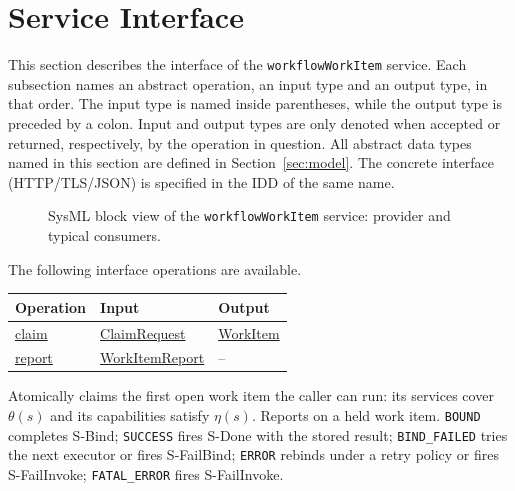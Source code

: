 \documentclass[a4paper]{arrowhead}
\newcommand{\mref}[1]{{\textcolor{ArrowheadPurple}{\hyperref[sec:model:#1]{#1}}}}
\newcommand{\oref}[1]{{\textcolor{ArrowheadBlue}{\hyperref[sec:operations:#1]{#1}}}}
\begin{document}
\newpage
\section{Service Interface}
\label{sec:operations}
This section describes the interface of the \texttt{workflowWorkItem} service. Each subsection names an abstract operation,
an input type and an output type, in that order. The input type is named inside parentheses, while the output type is
preceded by a colon. Input and output types are only denoted when accepted or returned, respectively, by the operation
in question. All abstract data types named in this section are defined in Section~\ref{sec:model}. The concrete
interface (HTTP/TLS/JSON) is specified in the IDD of the same name.

\begin{figure}[ht!]
  \centering
  \caption{SysML block view of the \texttt{workflowWorkItem} service: provider and typical consumers.}
  \label{fig:SD}
\end{figure}

The following interface operations are available.

{\small
\begin{longtable}{|p{4.4cm}|p{5.6cm}|p{5.8cm}|}

\hline
\rowcolor{gray!33} Operation & Input & Output \\ \hline
\endhead
\oref{claim} & \mref{ClaimRequest} & \mref{WorkItem} \\ \hline
\oref{report} & \mref{WorkItemReport} & -- \\ \hline
\end{longtable}
}

Atomically claims the first open work item the caller can run: its services cover $\theta(s)$ and its capabilities satisfy $\eta(s)$.
Reports on a held work item. \texttt{BOUND} completes S-Bind; \texttt{SUCCESS} fires S-Done with the stored result; \texttt{BIND\_FAILED} tries the next executor or fires S-FailBind; \texttt{ERROR} rebinds under a retry policy or fires S-FailInvoke; \texttt{FATAL\_ERROR} fires S-FailInvoke.
\end{document}

